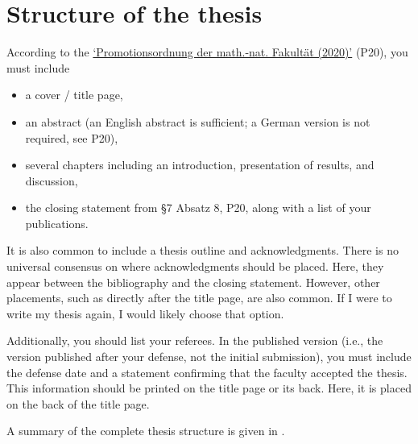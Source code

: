 \section{Structure of the thesis}
According to the \href{https://mathnat.uni-koeln.de/sites/dekanat/official/Ordnungen/Promotionsordnung_2020.pdf}{`Promotionsordnung der math.-nat. Fakultät (2020)'} (P20), you must include
\begin{itemize}
	\item a cover / title page,
	\item an abstract (an English abstract is sufficient; a German version is not required, see P20),
	\item several chapters including an introduction, presentation of results, and discussion,
	\item the closing statement from §7 Absatz 8, P20, along with a list of your publications.
\end{itemize}
It is also common to include a thesis outline and acknowledgments. There is no universal consensus on where acknowledgments should be placed. Here, they appear between the bibliography and the closing statement. However, other placements, such as directly after the title page, are also common. If I were to write my thesis again, I would likely choose that option.

Additionally, you should list your referees. In the published version (i.e., the version published after your defense, not the initial submission), you must include the defense date and a statement confirming that the faculty accepted the thesis. This information should be printed on the title page or its back. Here, it is placed on the back of the title page.

A summary of the complete thesis structure is given in .


